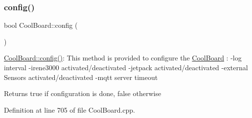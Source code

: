 \mbox{\label{class_cool_board_a583a874c09c07e70a6eb9229fc4beddb}} 
\subsubsection{\texorpdfstring{config()}{config()}}
{\footnotesize\ttfamily bool Cool\+Board\+::config (\begin{DoxyParamCaption}{ }\end{DoxyParamCaption})}

\hyperlink{class_cool_board_a583a874c09c07e70a6eb9229fc4beddb}{Cool\+Board\+::config()}\+: This method is provided to configure the \hyperlink{class_cool_board}{Cool\+Board} \+: -\/log interval -\/irene3000 activated/deactivated -\/jetpack activated/deactivated -\/external Sensors activated/deactivated -\/mqtt server timeout

\begin{DoxyReturn}{Returns}
true if configuration is done, false otherwise 
\end{DoxyReturn}


Definition at line 705 of file Cool\+Board.\+cpp.


